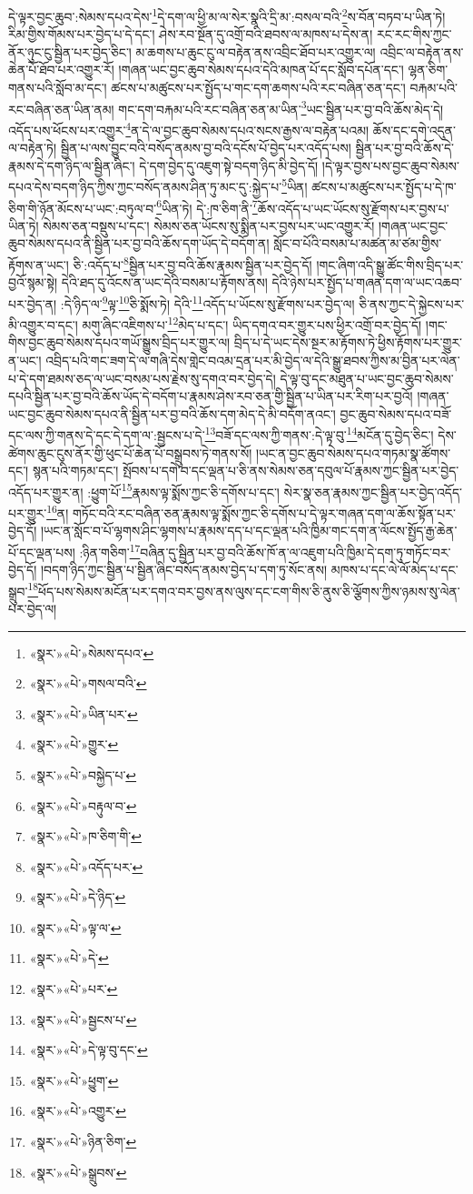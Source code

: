 དེ་ལྟར་བྱང་ཆུབ་:སེམས་དཔའ་དེས་\footnote{«སྣར་»«པེ་»སེམས་དཔའ་}དེ་དག་ལ་ཕྱི་མ་ལ་སེར་སྣའི་དྲི་མ་:བསལ་བའི་\footnote{«སྣར་»«པེ་»གསལ་བའི་}ས་བོན་བཏབ་པ་ཡིན་ཏེ། རིམ་གྱིས་གོམས་པར་བྱེད་པ་དེ་དང་། ཤེས་རབ་སྔོན་དུ་འགྲོ་བའི་ཐབས་ལ་མཁས་པ་དེས་ན། རང་རང་གིས་ཀྱང་ནོར་ཉུང་ངུ་སྦྱིན་པར་བྱེད་ཅིང་། མ་ཆགས་པ་ཆུང་ངུ་ལ་བརྟེན་ནས་འབྲིང་ཐོབ་པར་འགྱུར་ལ། འབྲིང་ལ་བརྟེན་ནས་ཆེན་པོ་ཐོབ་པར་འགྱུར་རོ། །གཞན་ཡང་བྱང་ཆུབ་སེམས་དཔའ་དེའི་མཁན་པོ་དང་སློབ་དཔོན་དང་། ལྷན་ཅིག་གནས་པའི་སློབ་མ་དང་། ཚངས་པ་མཚུངས་པར་སྤྱོད་པ་གང་དག་ཆགས་པའི་རང་བཞིན་ཅན་དང་། བརྐམ་པའི་རང་བཞིན་ཅན་ཡིན་ནམ། གང་དག་བརྐམ་པའི་རང་བཞིན་ཅན་མ་ཡིན་\footnote{«སྣར་»«པེ་»ཡིན་པར་}ཡང་སྦྱིན་པར་བྱ་བའི་ཆོས་མེད་དེ། འདོད་པས་ཕོངས་པར་འགྱུར་\footnote{«སྣར་»«པེ་»གྱུར་}ན་དེ་ལ་བྱང་ཆུབ་སེམས་དཔའ་སངས་རྒྱས་ལ་བརྟེན་པའམ། ཆོས་དང་དགེ་འདུན་ལ་བརྟེན་ཏེ། སྦྱིན་པ་ལས་བྱུང་བའི་བསོད་ནམས་བྱ་བའི་དངོས་པོ་བྱེད་པར་འདོད་པས། སྦྱིན་པར་བྱ་བའི་ཆོས་དེ་རྣམས་དེ་དག་ཉིད་ལ་སྦྱིན་ཞིང་། དེ་དག་བྱེད་དུ་འཇུག་སྟེ་བདག་ཉིད་མི་བྱེད་དོ། །དེ་ལྟར་བྱས་པས་བྱང་ཆུབ་སེམས་དཔའ་དེས་བདག་ཉིད་ཀྱིས་ཀྱང་བསོད་ནམས་ཤིན་ཏུ་མང་དུ་:སྐྱེད་པ་\footnote{«སྣར་»«པེ་»བསྐྱེད་པ་}ཡིན། ཚངས་པ་མཚུངས་པར་སྤྱོད་པ་དེ་ཁ་ཅིག་གི་ཉོན་མོངས་པ་ཡང་:བཏུལ་བ་\footnote{«སྣར་»«པེ་»བརྟུལ་བ་}ཡིན་ཏེ། དེ་:ཁ་ཅིག་ནི་\footnote{«སྣར་»«པེ་»ཁ་ཅིག་གི་}ཆོས་འདོད་པ་ཡང་ཡོངས་སུ་རྫོགས་པར་བྱས་པ་ཡིན་ཏེ། སེམས་ཅན་བསྡུས་པ་དང་། སེམས་ཅན་ཡོངས་སུ་སྨིན་པར་བྱས་པར་ཡང་འགྱུར་རོ། །གཞན་ཡང་བྱང་ཆུབ་སེམས་དཔའ་ནི་སྦྱིན་པར་བྱ་བའི་ཆོས་དག་ཡོད་དེ་བདོག་ན། སློང་བ་པོའི་བསམ་པ་མཚན་མ་ཙམ་གྱིས་རྟོགས་ན་ཡང་། ཅི་:འདོད་པ་\footnote{«སྣར་»«པེ་»འདོད་པར་}སྦྱིན་པར་བྱ་བའི་ཆོས་རྣམས་སྦྱིན་པར་བྱེད་དོ། །གང་ཞིག་འདི་སྒྱུ་ཚོང་གིས་བྲིད་པར་བྱའོ་སྙམ་སྟེ། དེའི་ཐད་དུ་འོངས་ན་ཡང་དེའི་བསམ་པ་རྟོགས་ནས། དེའི་ཉེས་པར་སྤྱོད་པ་གཞན་དག་ལ་ཡང་འཆབ་པར་བྱེད་ན། :དེ་ཉིད་ལ་\footnote{«སྣར་»«པེ་»དེ་ཉིད་}ལྟ་\footnote{«སྣར་»«པེ་»ལྟ་ལ་}ཅི་སྨོས་ཏེ། དེའི་\footnote{«སྣར་»«པེ་»དེ་}འདོད་པ་ཡོངས་སུ་རྫོགས་པར་བྱེད་ལ། ཅི་ནས་ཀྱང་དེ་སྐྱེངས་པར་མི་འགྱུར་བ་དང་། མགུ་ཞིང་འཇིགས་པ་\footnote{«སྣར་»«པེ་»པར་}མེད་པ་དང་། ཡིད་དགའ་བར་གྱུར་པས་ཕྱིར་འགྲོ་བར་བྱེད་དོ། །གང་གིས་བྱང་ཆུབ་སེམས་དཔའ་གཡོ་སྒྱུས་བྲིད་པར་གྱུར་ལ། བྲིད་པ་དེ་ཡང་དེས་སྔར་མ་རྟོགས་ཏེ་ཕྱིས་རྟོགས་པར་གྱུར་ན་ཡང་། འབྲིད་པའི་གང་ཟག་དེ་ལ་གཞི་དེས་གླེང་བའམ་དྲན་པར་མི་བྱེད་ལ་དེའི་སྒྱུ་ཐབས་ཀྱིས་མ་བྱིན་པར་ལེན་པ་དེ་དག་ཐམས་ཅད་ལ་ཡང་བསམ་པས་རྗེས་སུ་དགའ་བར་བྱེད་དེ། དེ་ལྟ་བུ་དང་མཐུན་པ་ཡང་བྱང་ཆུབ་སེམས་དཔའི་སྦྱིན་པར་བྱ་བའི་ཆོས་ཡོད་དེ་བདོག་པ་རྣམས་ཤེས་རབ་ཅན་གྱི་སྦྱིན་པ་ཡིན་པར་རིག་པར་བྱའོ། །གཞན་ཡང་བྱང་ཆུབ་སེམས་དཔའ་ནི་སྦྱིན་པར་བྱ་བའི་ཆོས་དག་མེད་དེ་མི་བདོག་ནའང་། བྱང་ཆུབ་སེམས་དཔའ་བཟོ་དང་ལས་ཀྱི་གནས་དེ་དང་དེ་དག་ལ་:སྦྱངས་པ་དེ་\footnote{«སྣར་»«པེ་»སྦྱངས་པ་}བཟོ་དང་ལས་ཀྱི་གནས་:དེ་ལྟ་བུ་\footnote{«སྣར་»«པེ་»དེ་ལྟ་བུ་དང་}མངོན་དུ་བྱེད་ཅིང་། དེས་ཚེགས་ཆུང་ངུས་ནོར་གྱི་ཕུང་པོ་ཆེན་པོ་བསྒྲུབས་ཏེ་གནས་སོ། །ཡང་ན་བྱང་ཆུབ་སེམས་དཔའ་གཏམ་སྣ་ཚོགས་དང་། སྙན་པའི་གཏམ་དང་། སྤོབས་པ་དགེ་བ་དང་ལྡན་པ་ཅི་ནས་སེམས་ཅན་དབུལ་པོ་རྣམས་ཀྱང་སྦྱིན་པར་བྱེད་འདོད་པར་གྱུར་ན། :ཕྱུག་པོ་\footnote{«སྣར་»«པེ་»ཕྱུག་}རྣམས་ལྟ་སྨོས་ཀྱང་ཅི་དགོས་པ་དང་། སེར་སྣ་ཅན་རྣམས་ཀྱང་སྦྱིན་པར་བྱེད་འདོད་པར་གྱུར་\footnote{«སྣར་»«པེ་»འགྱུར་}ན། གཏོང་བའི་རང་བཞིན་ཅན་རྣམས་ལྟ་སྨོས་ཀྱང་ཅི་དགོས་པ་དེ་ལྟར་གཞན་དག་ལ་ཆོས་སྟོན་པར་བྱེད་དོ། །ཡང་ན་སློང་བ་པོ་ལྷགས་ཤིང་ལྷགས་པ་རྣམས་དད་པ་དང་ལྡན་པའི་ཁྱིམ་གང་དག་ན་ལོངས་སྤྱོད་རྒྱ་ཆེན་པོ་དང་ལྡན་པས། :ཉིན་གཅིག་\footnote{«སྣར་»«པེ་»ཉིན་ཅིག་}བཞིན་དུ་སྦྱིན་པར་བྱ་བའི་ཆོས་ཁོ་ན་ལ་འཇུག་པའི་ཁྱིམ་དེ་དག་ཏུ་གཏོང་བར་བྱེད་དོ། །བདག་ཉིད་ཀྱང་སྦྱིན་པ་སྦྱིན་ཞིང་བསོད་ནམས་བྱེད་པ་དག་ཏུ་སོང་ནས། མཁས་པ་དང་ལེ་ལོ་མེད་པ་དང་སྒྲུབ་\footnote{«སྣར་»«པེ་»སྒྲུབས་}ཕོད་པས་སེམས་མངོན་པར་དགའ་བར་བྱས་ནས་ལུས་དང་ངག་གིས་ཅི་ནུས་ཅི་ལྕོགས་ཀྱིས་ཉམས་སུ་ལེན་པར་བྱེད་ལ། 